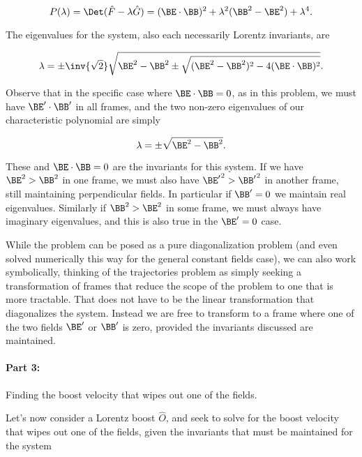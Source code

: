 \begin{equation}\label{eqn:relElectroDynProblemSet3:1620}
P(\lambda) = \Det (\hat{F} - \lambda \hat{G}) = (\BE \cdot \BB)^2 + \lambda^2 (\BB^2 - \BE^2) + \lambda^4.
\end{equation}

The eigenvalues for the system, also each necessarily Lorentz invariants, are

\begin{equation}\label{eqn:relElectroDynProblemSet3:1080b}
\lambda = \pm \inv{\sqrt{2}} \sqrt{ \BE^2 - \BB^2 \pm \sqrt{ (\BE^2 - \BB^2)^2 - 4 (\BE \cdot \BB)^2 }}.
\end{equation}

Observe that in the specific case where $\BE \cdot \BB = 0$, as in this problem, we must have $\BE' \cdot \BB'$ in all frames, and the two non-zero eigenvalues of our characteristic polynomial are simply

\begin{equation}\label{eqn:relElectroDynProblemSet3:1640}
\lambda = \pm \sqrt{\BE^2 - \BB^2}.
\end{equation}

These and $\BE \cdot \BB = 0$ are the invariants for this system.   If we have $\BE^2 > \BB^2$ in one frame, we must also have ${\BE'}^2 > {\BB'}^2$ in another frame, still maintaining perpendicular fields.  In particular if $\BB' = 0$ we maintain real eigenvalues.  Similarly if $\BB^2 > \BE^2$ in some frame, we must always have imaginary eigenvalues, and this is also true in the $\BE' = 0$ case.  

While the problem can be posed as a pure diagonalization problem (and even solved numerically this way for the general constant fields case), we can also work symbolically, thinking of the trajectories problem as simply seeking a transformation of frames that reduce the scope of the problem to one that is more tractable.  That does not have to be the linear transformation that diagonalizes the system.  Instead we are free to transform to a frame where one of the two fields $\BE'$ or $\BB'$ is zero, provided the invariants discussed are maintained.

\paragraph{Part 3:} Finding the boost velocity that wipes out one of the fields.

Let's now consider a Lorentz boost $\hat{O}$, and seek to solve for the boost velocity that wipes out one of the fields, given the invariants that must be maintained for the system

